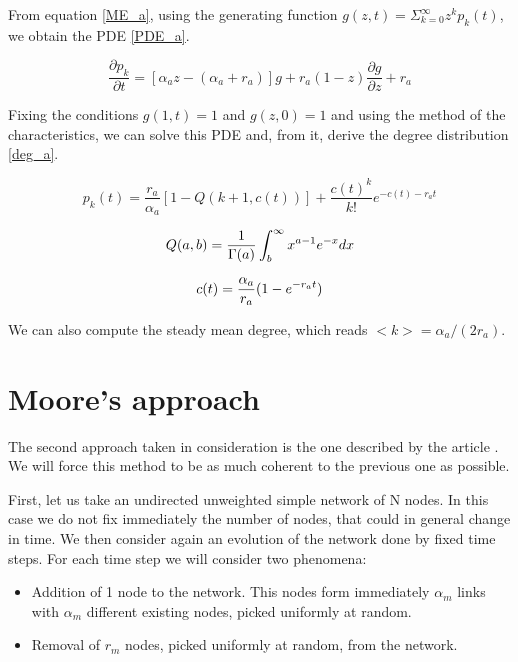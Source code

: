 From equation \eqref{ME_a}, using the generating function $g(z,t)=\Sigma_{k=0}^{\infty}z^k p_k (t)$, we obtain the PDE \eqref{PDE_a}.

\begin{equation}
\frac{\partial{p_{k}}}{\partial{t}} = [ \alpha_a z - (\alpha_a + r_a) ]g + r_a (1-z)\frac{\partial{g}}{\partial{z}} + r_a \label{PDE_a}
\end{equation}

Fixing the conditions $g(1,t)=1$ and $g(z,0)=1$ and using the method of the characteristics, we can solve this PDE and, from it, derive the degree distribution \eqref{deg_a}.

\begin{equation}
p_k(t) = \frac{r_a}{\alpha_a}[1-Q(k+1,c(t))] + \frac{c(t)^k}{k!}e^{-c(t)-r_at} \label{deg_a}
\end{equation}

\begin{equation}
Q(a,b)=\frac{1}{\Gamma(a)} \int_{b}^{\infty}{x^{a-1}e^{-x}dx} \notag
\end{equation}

\begin{equation}
c(t)=\frac{\alpha_a}{r_a} (1-e^{-r_at})\notag
\end{equation}

We can also compute the steady mean degree, which reads $<k>=\alpha_a/(2r_a)$.

\section{Moore's approach}

The second approach taken in consideration is the one described by the article \cite{moore2006exact}. We will force this method to be as much coherent to the previous one as possible.

First, let us take an undirected unweighted simple network of N nodes. In this case we do not fix immediately the number of nodes, that could in general change in time. We then consider again an evolution of the network done by fixed time steps. For each time step we will consider two phenomena:
\begin{itemize}
    \item Addition of 1 node to the network. This nodes form immediately $\alpha_m$ links with $\alpha_m$ different existing nodes, picked uniformly at random.
    \item Removal of $r_m$ nodes, picked uniformly at random, from the network.
\end{itemize}

